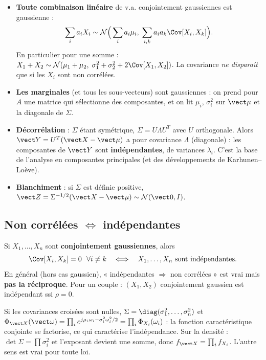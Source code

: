 \documentclass[11pt,a4paper,openany]{book}
\begin{document}
\begin{propbox}[title={Conséquences}]
\begin{itemize}
\item \textbf{Toute combinaison linéaire} de v.a. conjointement gaussiennes est gaussienne :
  \[
  \sum_i a_iX_i \sim \mathcal{N}\Big(\sum_i a_i\mu_i,\;\sum_{i,k}a_ia_k\Cov[X_i,X_k]\Big).
  \]
  En particulier pour une somme : $X_1+X_2 \sim \mathcal{N}(\mu_1+\mu_2,\;
  \sigma_1^2+\sigma_2^2+2\Cov[X_1,X_2])$. La covariance \emph{ne disparaît} que si les $X_i$ sont
  non corrélées.
\item \textbf{Les marginales} (et tous les sous-vecteurs) sont gaussiennes : on prend pour $A$
  une matrice qui sélectionne des composantes, et on lit $\mu_i$, $\sigma_i^2$ sur $\vect\mu$ et
  la diagonale de $\Sigma$.
\item \textbf{Décorrélation} : $\Sigma$ étant symétrique, $\Sigma = U\Lambda U^T$ avec $U$
  orthogonale. Alors $\vect Y = U^T(\vect X-\vect\mu)$ a pour covariance $\Lambda$ (diagonale) :
  les composantes de $\vect Y$ sont \textbf{indépendantes}, de variances $\lambda_i$. C'est la
  base de l'analyse en composantes principales (et des développements de Karhunen--Loève).
\item \textbf{Blanchiment} : si $\Sigma$ est définie positive, $\vect Z = \Sigma^{-1/2}(\vect
  X-\vect\mu)\sim\mathcal{N}(\vect 0,I)$.
\end{itemize}
\end{propbox}

\subsection{Non corrélées $\Longleftrightarrow$ indépendantes}

\begin{keybox}[title={Propriété fondamentale du cas gaussien}]
Si $X_1,\dots,X_n$ sont \textbf{conjointement gaussiennes}, alors
\[
\Cov[X_i,X_k]=0\ \ \forall i\neq k
\quad\Longleftrightarrow\quad
X_1,\dots,X_n \text{ sont indépendantes.}
\]
En général (hors cas gaussien), « indépendantes $\Rightarrow$ non corrélées » est vrai mais
\textbf{pas la réciproque}. Pour un couple : $(X_1,X_2)$ conjointement gaussien est indépendant
ssi $\rho = 0$.
\end{keybox}

\begin{proofbox}[title=Preuve]
Si les covariances croisées sont nulles, $\Sigma = \diag(\sigma_1^2,\dots,\sigma_n^2)$ et
$\Phi_{\vect X}(\vect\omega) = \prod_i e^{j\mu_i\omega_i - \sigma_i^2\omega_i^2/2} = \prod_i
\Phi_{X_i}(\omega_i)$ : la fonction caractéristique conjointe se factorise, ce qui caractérise
l'indépendance. Sur la densité : $\det\Sigma = \prod\sigma_i^2$ et l'exposant devient une
somme, donc $f_{\vect X} = \prod_i f_{X_i}$. L'autre sens est vrai pour toute loi.
\end{proofbox}
\end{document}
